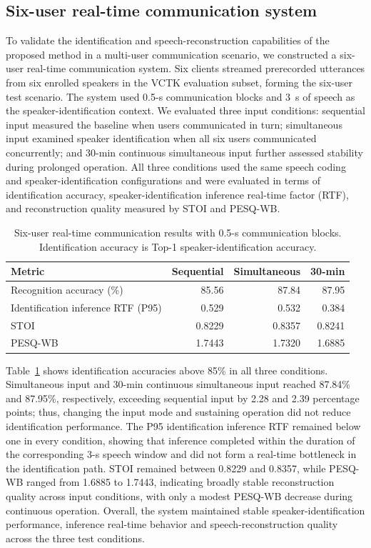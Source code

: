 \subsection{Six-user real-time communication system}
\label{sec:rv3-six-user}
To validate the identification and speech-reconstruction capabilities of the proposed method in a multi-user communication scenario, we constructed a six-user real-time communication system. Six clients streamed prerecorded utterances from six enrolled speakers in the VCTK evaluation subset, forming the six-user test scenario. The system used 0.5-s communication blocks and 3~s of speech as the speaker-identification context. We evaluated three input conditions: sequential input measured the baseline when users communicated in turn; simultaneous input examined speaker identification when all six users communicated concurrently; and 30-min continuous simultaneous input further assessed stability during prolonged operation. All three conditions used the same speech coding and speaker-identification configurations and were evaluated in terms of identification accuracy, speaker-identification inference real-time factor (RTF), and reconstruction quality measured by STOI and PESQ-WB.

\begin{table}[t]
\centering
\caption{Six-user real-time communication results with 0.5-s communication blocks. Identification accuracy is Top-1 speaker-identification accuracy.}
\label{tab:rv3-six-user}
\scriptsize\setlength{\tabcolsep}{3pt}
\begin{tabular}{lrrr}
\toprule
Metric & Sequential & Simultaneous & 30-min\\
\midrule
Recognition accuracy (\%) & 85.56 & 87.84 & 87.95\\
Identification inference RTF (P95) & 0.529 & 0.532 & 0.384\\
STOI & 0.8229 & 0.8357 & 0.8241\\
PESQ-WB & 1.7443 & 1.7320 & 1.6885\\
\bottomrule
\end{tabular}
\end{table}

Table~\ref{tab:rv3-six-user} shows identification accuracies above 85\% in all three conditions. Simultaneous input and 30-min continuous simultaneous input reached 87.84\% and 87.95\%, respectively, exceeding sequential input by 2.28 and 2.39 percentage points; thus, changing the input mode and sustaining operation did not reduce identification performance. The P95 identification inference RTF remained below one in every condition, showing that inference completed within the duration of the corresponding 3-s speech window and did not form a real-time bottleneck in the identification path. STOI remained between 0.8229 and 0.8357, while PESQ-WB ranged from 1.6885 to 1.7443, indicating broadly stable reconstruction quality across input conditions, with only a modest PESQ-WB decrease during continuous operation. Overall, the system maintained stable speaker-identification performance, inference real-time behavior and speech-reconstruction quality across the three test conditions.
